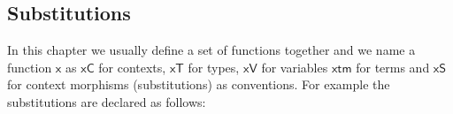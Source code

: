 \begin{code}\>\<%
\\
\> \<[12]%
\>[12]\AgdaSymbol{:} \AgdaSymbol{\{} \AgdaSymbol{:} \AgdaSymbol{\}\{}  \AgdaSymbol{:}  \AgdaSymbol{\}(} \AgdaSymbol{:}  \AgdaSymbol{)} \<[46]%
\>[46]\<%
\\
\>[0]\<[12]%
\>[12]      \<%
\\
\>    \<[12]%
\>[12]\AgdaSymbol{=} \<%
\\
%
\\
\> \<[12]%
\>[12]\AgdaSymbol{:} \AgdaSymbol{\{} \AgdaSymbol{:} \AgdaSymbol{\}\{}  \AgdaSymbol{:}  \AgdaSymbol{\}\{} \AgdaSymbol{:}  \AgdaSymbol{\}(} \AgdaSymbol{:}   \AgdaSymbol{)} \<[57]%
\>[57]\<%
\\
\>[0]\<[12]%
\>[12]      \<%
\\
\>  \<[12]%
\>[12]\AgdaSymbol{=}  \AgdaSymbol{\_}\<%
\\
\>\<\end{code}

\subsection{Substitutions}

In this chapter we usually define a set of functions together and
we name a function $\mathsf{x}$ as $\mathsf{xC}$ for contexts, $\mathsf{xT}$ for types, $\mathsf{xV}$ for
variables $\mathsf{xtm}$ for terms and $\mathsf{xS}$ for context morphisms (substitutions) as conventions. For example
the substitutions are declared as follows:

